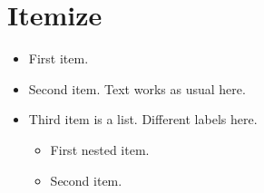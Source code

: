 \documentclass[12pt]{article}
\begin{document}
\section{Itemize}

\begin{itemize}
	\item First item.
	\item Second item. Text works as usual here.
	\item Third item is a list. Different labels here.
	\begin{itemize}
		\item First nested item.
		\item Second item.
	\end{itemize}
\end{itemize}
\end{document}
